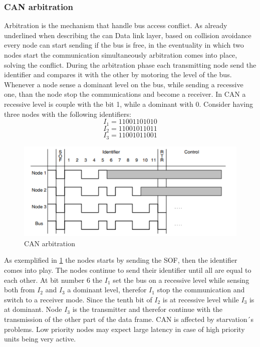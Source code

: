 \documentclass[../main.tex]{subfiles}
\begin{document}
\subsubsection{CAN arbitration}
Arbitration is the mechanism that handle bus access conflict. As already underlined when describing the can Data link layer, based on collision avoidance every node can start sending if the bus is free, in the eventuality in which two nodes start the communication simultaneously arbitration comes into place, solving the conflict. During the arbitration phase each transmitting node send the identifier and compares it with the other by motoring the level of the bus. Whenever a node sense a dominant level on the bus, while sending a recessive one, than the node stop the communications and become a receiver. In CAN a recessive level is couple with the bit 1, while a dominant with 0. Consider having three nodes with the following identifiers:
\begin{equation}
I_{1} = 11001101010
\end{equation}
\begin{equation}
I_{2} = 11001011011
\end{equation}
\begin{equation}
I_{3} = 11001011001
\end{equation}
\begin{figure}[h]
    \centering
    \includegraphics[width=\linewidth]{images_folder/can_arbitration.png}
    \caption{CAN arbitration}
    \label{fig:CANABR}
\end{figure}
As exemplified in \ref{fig:CANABR} the nodes starts by sending the SOF, then the identifier comes into play. The nodes continue to send their identifier until all are equal to each other. At bit number 6  the $I_1$ set the bus on a recessive level while sensing both from $I_2$ and $I_3$ a dominant level, therefor $I_1$ stop the communication and switch to a receiver mode. Since the tenth bit of $I_2$ is at recessive level while $I_3$ is at dominant. Node $I_3$ is the transmitter and therefor continue with the transmission of the other part of the data frame. CAN is affected by starvation´s problems. Low priority nodes may expect large latency in case of high priority units being very active. \\
\end{document}

